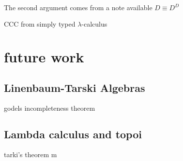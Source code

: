 The second argument comes from a note available
$D \equiv D^D$



CCC from simply typed $\lambda$-calculus
\section{future work}
\subsection{Linenbaum-Tarski Algebras}
godels incompleteness theorem
\subsection{Lambda calculus and topoi}
tarki's theorem
m
